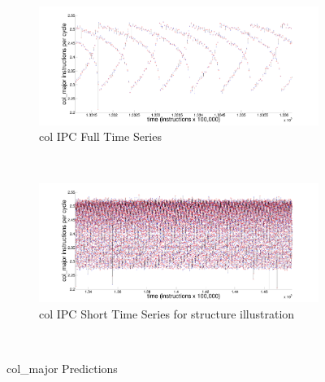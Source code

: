 \documentclass{article}
\begin{document}
\begin{figure}
        \centering
        \begin{subfigure}{\textwidth}
                \includegraphics[width=\textwidth]{figs/colPredShortTS}
                \caption{col IPC  Full Time Series}
                \label{fig:gull}
        \end{subfigure}%
        \newline
        ~ %
        \begin{subfigure}[b]{\textwidth}
                \includegraphics[width=\textwidth]{figs/colPredfullTS}
                \caption{col IPC  Short Time Series for structure illustration}
                \label{fig:svdFullColored}
        \end{subfigure}
        
        ~ %
         \caption{col\_major Predictions }\label{fig:svdFull}
\end{figure}
\end{document}
